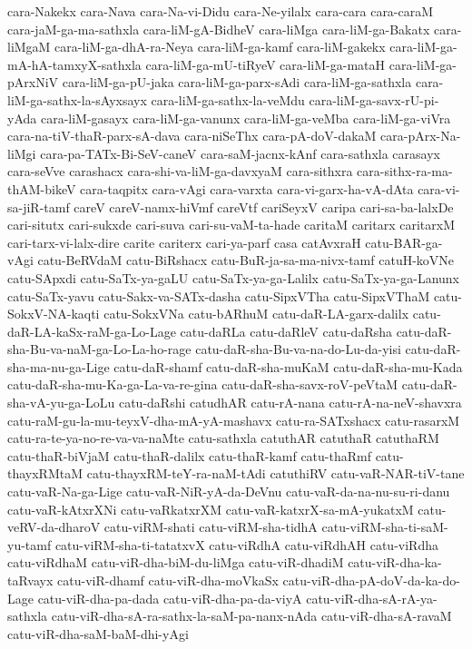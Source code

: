{cara-Nakekx
cara-Nava
cara-Na-vi-Didu
cara-Ne-yilalx
cara-cara
cara-caraM
cara-jaM-ga-ma-sathxla
cara-liM-gA-BidheV
cara-liMga
cara-liM-ga-Bakatx
cara-liMgaM
cara-liM-ga-dhA-ra-Neya
cara-liM-ga-kamf
cara-liM-gakekx
cara-liM-ga-mA-hA-tamxyX-sathxla
cara-liM-ga-mU-tiRyeV
cara-liM-ga-mataH
cara-liM-ga-pArxNiV
cara-liM-ga-pU-jaka
cara-liM-ga-parx-sAdi
cara-liM-ga-sathxla
cara-liM-ga-sathx-la-sAyxsayx
cara-liM-ga-sathx-la-veMdu
cara-liM-ga-savx-rU-pi-yAda
cara-liM-gasayx
cara-liM-ga-vanunx
cara-liM-ga-veMba
cara-liM-ga-viVra
cara-na-tiV-thaR-parx-sA-dava
cara-niSeThx
cara-pA-doV-dakaM
cara-pArx-Na-liMgi
cara-pa-TATx-Bi-SeV-caneV
cara-saM-jacnx-kAnf
cara-sathxla
carasayx
cara-seVve
carashacx
cara-shi-va-liM-ga-davxyaM
cara-sithxra
cara-sithx-ra-ma-thAM-bikeV
cara-taqpitx
cara-vAgi
cara-varxta
cara-vi-garx-ha-vA-dAta
cara-vi-sa-jiR-tamf
careV
careV-namx-hiVmf
careVtf
cariSeyxV
caripa
cari-sa-ba-lalxDe
cari-situtx
cari-sukxde
cari-suva
cari-su-vaM-ta-hade
caritaM
caritarx
caritarxM
cari-tarx-vi-lalx-dire
carite
cariterx
cari-ya-parf
casa
catAvxraH
catu-BAR-ga-vAgi
catu-BeRVdaM
catu-BiRshacx
catu-BuR-ja-sa-ma-nivx-tamf
catuH-koVNe
catu-SApxdi
catu-SaTx-ya-gaLU
catu-SaTx-ya-ga-Lalilx
catu-SaTx-ya-ga-Lanunx
catu-SaTx-yavu
catu-Sakx-va-SATx-dasha
catu-SipxVTha
catu-SipxVThaM
catu-SokxV-NA-kaqti
catu-SokxVNa
catu-bARhuM
catu-daR-LA-garx-dalilx
catu-daR-LA-kaSx-raM-ga-Lo-Lage
catu-daRLa
catu-daRleV
catu-daRsha
catu-daR-sha-Bu-va-naM-ga-Lo-La-ho-rage
catu-daR-sha-Bu-va-na-do-Lu-da-yisi
catu-daR-sha-ma-nu-ga-Lige
catu-daR-shamf
catu-daR-sha-muKaM
catu-daR-sha-mu-Kada
catu-daR-sha-mu-Ka-ga-La-va-re-gina
catu-daR-sha-savx-roV-peVtaM
catu-daR-sha-vA-yu-ga-LoLu
catu-daRshi
catudhAR
catu-rA-nana
catu-rA-na-neV-shavxra
catu-raM-gu-la-mu-teyxV-dha-mA-yA-mashavx
catu-ra-SATxshacx
catu-rasarxM
catu-ra-te-ya-no-re-va-va-naMte
catu-sathxla
catuthAR
catuthaR
catuthaRM
catu-thaR-biVjaM
catu-thaR-dalilx
catu-thaR-kamf
catu-thaRmf
catu-thayxRMtaM
catu-thayxRM-teY-ra-naM-tAdi
catuthiRV
catu-vaR-NAR-tiV-tane
catu-vaR-Na-ga-Lige
catu-vaR-NiR-yA-da-DeVnu
catu-vaR-da-na-nu-su-ri-danu
catu-vaR-kAtxrXNi
catu-vaRkatxrXM
catu-vaR-katxrX-sa-mA-yukatxM
catu-veRV-da-dharoV
catu-viRM-shati
catu-viRM-sha-tidhA
catu-viRM-sha-ti-saM-yu-tamf
catu-viRM-sha-ti-tatatxvX
catu-viRdhA
catu-viRdhAH
catu-viRdha
catu-viRdhaM
catu-viR-dha-biM-du-liMga
catu-viR-dhadiM
catu-viR-dha-ka-taRvayx
catu-viR-dhamf
catu-viR-dha-moVkaSx
catu-viR-dha-pA-doV-da-ka-do-Lage
catu-viR-dha-pa-dada
catu-viR-dha-pa-da-viyA
catu-viR-dha-sA-rA-ya-sathxla
catu-viR-dha-sA-ra-sathx-la-saM-pa-nanx-nAda
catu-viR-dha-sA-ravaM
catu-viR-dha-saM-baM-dhi-yAgi
}
